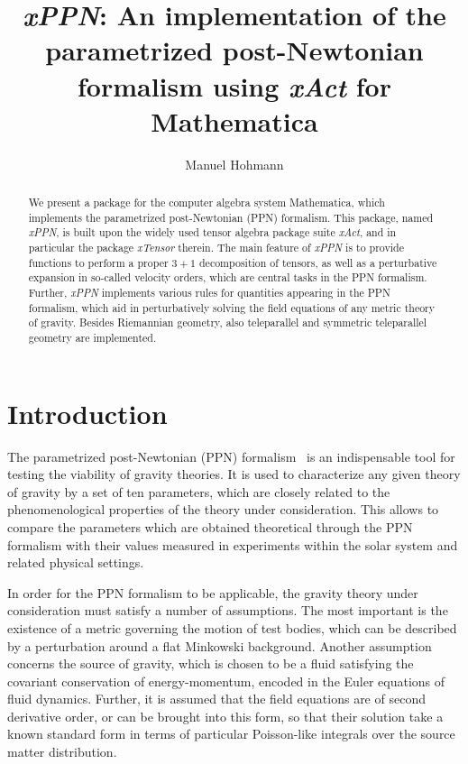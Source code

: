 \documentclass[notitlepage,a4paper,aps,prd,onecolumn,superscriptaddress,nofootinbib,groupedaddress,longbibliography]{revtex4-1}
\newcommand{\xPPN}{\emph{xPPN}}
\newcommand{\xAct}{\emph{xAct}}
\newcommand{\xTensor}{\emph{xTensor}}
\begin{document}
\title{\xPPN: An implementation of the parametrized post-Newtonian formalism using \xAct{} for Mathematica}

\author{Manuel Hohmann}

\begin{abstract}
We present a package for the computer algebra system Mathematica, which implements the parametrized post-Newtonian (PPN) formalism. This package, named \xPPN, is built upon the widely used tensor algebra package suite \xAct, and in particular the package \xTensor{} therein. The main feature of \xPPN{} is to provide functions to perform a proper $3+1$ decomposition of tensors, as well as a perturbative expansion in so-called velocity orders, which are central tasks in the PPN formalism. Further, \xPPN{} implements various rules for quantities appearing in the PPN formalism, which aid in perturbatively solving the field equations of any metric theory of gravity. Besides Riemannian geometry, also teleparallel and symmetric teleparallel geometry are implemented.
\end{abstract}

\maketitle

\section{Introduction}\label{sec:intro}
The parametrized post-Newtonian (PPN) formalism~\cite{Nordtvedt:1968qs,Thorne:1970wv,Will:1971zzb,Will:1971wt,Will:1993ns,Will:2014kxa,Will:2018bme} is an indispensable tool for testing the viability of gravity theories. It is used to characterize any given theory of gravity by a set of ten parameters, which are closely related to the phenomenological properties of the theory under consideration. This allows to compare the parameters which are obtained theoretical through the PPN formalism with their values measured in experiments within the solar system and related physical settings.

In order for the PPN formalism to be applicable, the gravity theory under consideration must satisfy a number of assumptions. The most important is the existence of a metric governing the motion of test bodies, which can be described by a perturbation around a flat Minkowski background. Another assumption concerns the source of gravity, which is chosen to be a fluid satisfying the covariant conservation of energy-momentum, encoded in the Euler equations of fluid dynamics. Further, it is assumed that the field equations are of second derivative order, or can be brought into this form, so that their solution take a known standard form in terms of particular Poisson-like integrals over the source matter distribution.
\end{document}
